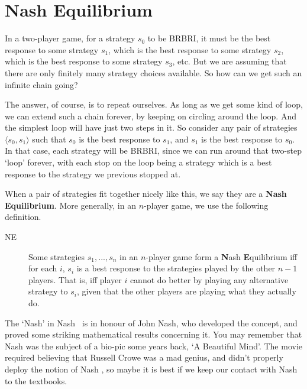 \section{Nash Equilibrium}
In a two-player game, for a strategy $s_0$ to be BRBRI, it must be the best response to some strategy $s_1$, which is the best response to some strategy $s_2$, which is the best response to some strategy $s_3$, etc. But we are assuming that there are only finitely many strategy choices available. So how can we get such an infinite chain going?

The answer, of course, is to repeat ourselves. As long as we get some kind of loop, we can extend such a chain forever, by keeping on circling around the loop. And the simplest loop will have just two steps in it. So consider any pair of strategies $\langle s_0, s_1 \rangle$ such that $s_0$ is the best response to $s_1$, and $s_1$ is the best response to $s_0$. In that case, each strategy will be BRBRI, since we can run around that two-step `loop' forever, with each stop on the loop being a strategy which is a best response to the strategy we previous stopped at.

When a pair of strategies fit together nicely like this, we say they are a \textbf{Nash Equilibrium}. More generally, in an $n$-player game, we use the following definition.

\begin{description}
\item[NE] Some strategies $s_1, ..., s_n$ in an $n$-player game form a \textbf{N}ash \textbf{E}quilibrium iff for each $i$, $s_i$ is a best response to the strategies played by the other $n-1$ players. That is, iff player $i$ cannot do better by playing any alternative strategy to $s_i$, given that the other players are playing what they actually do.
\end{description}

\noindent The `Nash' in Nash \Eqm\ is in honour of John Nash, who developed the concept, and proved some striking mathematical results concerning it. You may remember that Nash was the subject of a bio-pic some years back, `A Beautiful Mind'. The movie required believing that Russell Crowe was a mad genius, and didn't properly deploy the notion of Nash \Eqm, so maybe it is best if we keep our contact with Nash to the textbooks.


